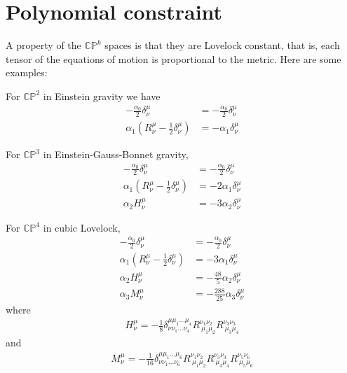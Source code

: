 \newpage
\section{Polynomial constraint}
A property of the $\mathbb{CP}^k$ spaces is that they are Lovelock constant, that is, each tensor of the equations of motion is proportional to the metric. Here are some examples:

For $\mathbb{CP}^2$ in Einstein gravity we have
\begin{align*}
    -\frac{\alpha_0}{2}\delta^\mu_\nu&=-\frac{\alpha_0}{2}\delta^\mu_\nu\\
    \alpha_1\left(R^\mu_\nu-\frac{1}{2}\delta^\mu_\nu\right)&=-\alpha_1\delta^\mu_\nu
\end{align*}

For $\mathbb{CP}^3$ in Einstein-Gauss-Bonnet gravity,
\begin{align*}
    -\frac{\alpha_0}{2}\delta^\mu_\nu&=-\frac{\alpha_0}{2}\delta^\mu_\nu\\
    \alpha_1\left(R^\mu_\nu-\frac{1}{2}\delta^\mu_\nu\right)&=-2\alpha_1\delta^\mu_\nu\\
    \alpha_2 H^\mu_\nu&=-3\alpha_2\delta^\mu_\nu
\end{align*}

For $\mathbb{CP}^4$ in cubic Lovelock,
\begin{align*}
    -\frac{\alpha_0}{2}\delta^\mu_\nu&=-\frac{\alpha_0}{2}\delta^\mu_\nu\\
    \alpha_1\left(R^\mu_\nu-\frac{1}{2}\delta^\mu_\nu\right)&=-3\alpha_1\delta^\mu_\nu\\
    \alpha_2 H^\mu_\nu&=-\frac{48}{5}\alpha_2\delta^\mu_\nu\\
    \alpha_3M^\mu_\nu&=-\frac{288}{25}\alpha_3\delta^\mu_\nu
\end{align*}
where
\begin{align*}
    H^\mu_\nu=-\frac{1}{8}\delta^{\mu\mu_1...\mu_4}_{\nu\nu_1...\nu_4}R^{\nu_1\nu_2}_{\  \mu_1\mu_2}R^{\nu_3\nu_3}_{\  \mu_3\mu_4}
\end{align*}
and
\begin{align*}
    M^\mu_\nu=-\frac{1}{16}\delta^{\mu\mu_1...\mu_6}_{\nu\nu_1...\nu_6}R^{\nu_1\nu_2}_{\  \mu_1\mu_2}R^{\nu_3\nu_3}_{\  \mu_3\mu_4}R^{\nu_5\nu_6}_{\  \mu_5\mu_6}
\end{align*}

